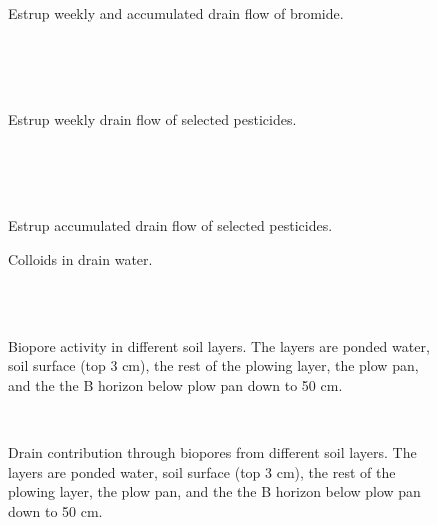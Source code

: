 \begin{figure}[htbp]
  \begin{center}
    \\
  \end{center}
  \caption{Estrup weekly and accumulated drain flow of bromide.}
  \label{fig:Estrup-bromide-weekly}
\end{figure}\FloatBarrier


\begin{figure}[htbp]
  \begin{center}
    \\
    \\
    \\
  \end{center}
  \caption{Estrup weekly drain flow of selected pesticides.}
  \label{fig:Estrup-weekly}
\end{figure}\FloatBarrier

\begin{figure}[htbp]
  \begin{center}
    \\
    \\
    \\
  \end{center}
  \caption{Estrup accumulated drain flow of selected pesticides.}
  \label{fig:Estrup-acc}
\end{figure}\FloatBarrier

\begin{figure}[htbp]
  \begin{center}
  \end{center}
  \caption{Colloids in drain water.}
  \label{fig:Estrup-colloids}
\end{figure}\FloatBarrier

\begin{figure}[htbp]
  \begin{center}
    \\
    \\
  \end{center}
  \caption{Biopore activity in different soil layers.  The layers are
    ponded water, soil surface (top 3 cm), the rest of the plowing layer,
    the plow pan, and the the B horizon below plow pan down to 50 cm.}
  \label{fig:Estrup-biopore}
\end{figure}\FloatBarrier

\begin{figure}[htbp]
  \begin{center}
    \\
  \end{center}
  \caption{Drain contribution through biopores from different soil
    layers.  The layers are ponded water, soil surface (top 3 cm), the
    rest of the plowing layer, the plow pan, and the the B horizon
    below plow pan down to 50 cm.}
  \label{fig:Estrup-biopore-drain}
\end{figure}\FloatBarrier
